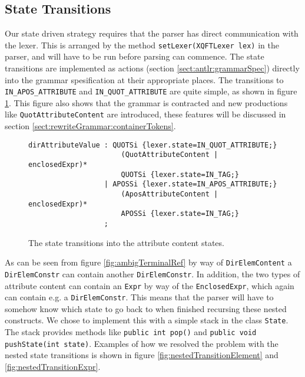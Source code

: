 \subsection{State Transitions}
\label{sect:rewriteGrammar:transitions}
Our state driven strategy requires that the parser has direct communication with the lexer. This is arranged by the method \verb!setLexer(XQFTLexer lex)! in the parser, and will have to be run before parsing can commence. The state transitions are implemented as actions (section \ref{sect:antlr:grammarSpec}) directly into the grammar spesification at their appropriate places. The transitions to \verb!IN_APOS_ATTRIBUTE! and \verb!IN_QUOT_ATTRIBUTE! are quite simple, as shown in figure \ref{fig:transitionSimple}. This figure also shows that the grammar is contracted and new productions like \verb!QuotAttributeContent! are introduced, these features will be discussed in section \ref{sect:rewriteGrammar:containerTokens}.
\begin{figure}[h!]
\begin{verbatim}
dirAttributeValue : QUOTSi {lexer.state=IN_QUOT_ATTRIBUTE;}
                      (QuotAttributeContent | enclosedExpr)* 
                      QUOTSi {lexer.state=IN_TAG;}
                  | APOSSi {lexer.state=IN_APOS_ATTRIBUTE;}
                      (AposAttributeContent | enclosedExpr)* 
                      APOSSi {lexer.state=IN_TAG;}
                  ; 
\end{verbatim}
\caption[Attribute content state transitions.]{The state transitions into the attribute content states.}
\label{fig:transitionSimple}
\end{figure}

As can be seen from figure \ref{fig:ambigTerminalRef} by way of \verb!DirElemContent! a \verb!DirElemConstr! can contain another \verb!DirElemConstr!. In addition, the two types of attribute content can contain an \verb!Expr! by way of the \verb!EnclosedExpr!, which again can contain e.g. a \verb!DirElemConstr!. This means that the parser will have to somehow know which state to go back to when finished recursing these nested constructs. We chose to implement this with a simple stack in the class \verb!State!. The stack provides methods like \verb!public int pop()! and \verb!public void pushState(int state)!. Examples of how we resolved the problem with the nested state transitions is shown in figure \ref{fig:nestedTransitionElement} and \ref{fig:nestedTransitionExpr}.

